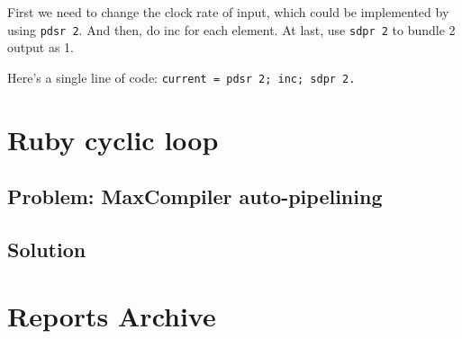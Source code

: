 \documentclass[a4paper, 10pt]{article}
\begin{document}
First we need to change the clock rate of input, which could be implemented by using \texttt{pdsr 2}. And then, do inc for each element. At last, use \texttt{sdpr 2} to bundle 2 output as 1.

Here's a single line of code: \lstinline{current = pdsr 2; inc; sdpr 2.}

\section{Ruby cyclic loop}

\subsection{Problem: MaxCompiler auto-pipelining}

\subsection{Solution}


\newpage

\section{Reports Archive}
 \newpage
 \newpage
   
\end{document}
